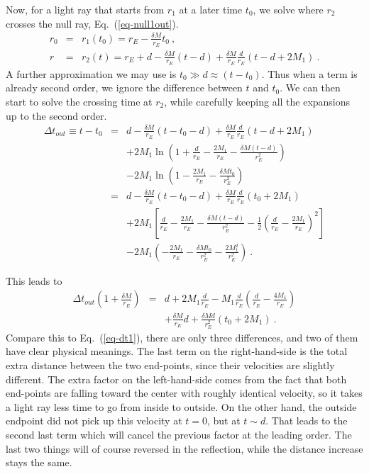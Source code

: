 \documentclass[12pt,letterpaper]{JHEP3}
\begin{document}
Now, for a light ray that starts from $r_1$ at a later time $t_0$, we solve where $r_2$ crosses the null ray, Eq.~(\ref{eq-null1out}).
\begin{eqnarray}
r_0 &=& r_1(t_0) = r_E - \frac{\delta M}{r_E}t_0~, \\
r &=& r_2(t) = r_E + d - \frac{\delta M}{r_E}(t-d) + \frac{\delta M}{r_E}\frac{d}{r_E}(t-d+2M_1)~.
\end{eqnarray}
A further approximation we may use is $t_0\gg d\approx(t-t_0)$. Thus when a term is already second order, we ignore the difference between $t$ and $t_0$. We can then start to solve the crossing time at $r_2$, while carefully keeping all the expansions up to the second order.
\begin{eqnarray}
\Delta t_{out}\equiv t - t_0 &=& d - \frac{\delta M}{r_E}(t - t_0 - d)
+ \frac{\delta M}{r_E}\frac{d}{r_E}(t-d+2M_1) \label{eq-SolveCross} \\ \nonumber
& & + 2M_{1}\ln\left(1+\frac{d}{r_E}-\frac{2M_{1}}{r_E} -\frac{\delta M(t-d)}{r_E^2} \right) 
\\ \nonumber
& & - 2M_{1}\ln\left(1-\frac{2M_{1}}{r_E} -\frac{\delta Mt_0}{r_E^2} \right)
\\ \nonumber
&=& d - \frac{\delta M}{r_E}(t - t_0 - d)
+ \frac{\delta M}{r_E}\frac{d}{r_E}(t_0+2M_1) \\ \nonumber
& & + 2M_{1} \left[ \frac{d}{r_E}-\frac{2M_{1}}{r_E} -\frac{\delta M(t-d)}{r_E^2}  - \frac{1}{2} \left( \frac{d}{r_E}-\frac{2M_{1}}{r_E} \right)^2 \right] \\ \nonumber
& & - 2M_{1} \left( -\frac{2M_{1}}{r_E} -\frac{\delta Mt_0}{r_E^2} - \frac{2M_{1}^2}{r_E^2} \right)~.
\end{eqnarray}

This leads to
\begin{eqnarray}
\Delta t_{out} \left(1 + \frac{\delta M}{r_E}\right) &=& 
d + 2M_{1}\frac{d}{r_E} - M_{1}\frac{d}{r_E}
\left( \frac{d}{r_E}-\frac{4M_{1}}{r_E} \right) \\ \nonumber
& & + \frac{\delta M}{r_E}d + \frac{\delta Md}{r_E^2} (t_0+2M_1)~.
\end{eqnarray}
Compare this to Eq.~(\ref{eq-dt1}), there are only three differences, and two of them have clear physical meanings. The last term on the right-hand-side is the total extra distance between the two end-points, since their velocities are slightly different. The extra factor on the left-hand-side comes from the fact that both end-points are falling toward the center with roughly identical velocity, so it takes a light ray less time to go from inside to outside. On the other hand, the outside endpoint did not pick up this velocity at $t=0$, but at $t\sim d$. That leads to the second last term which will cancel the previous factor at the leading order. The last two things will of course reversed in the reflection, while the distance increase stays the same. 
\end{document}
